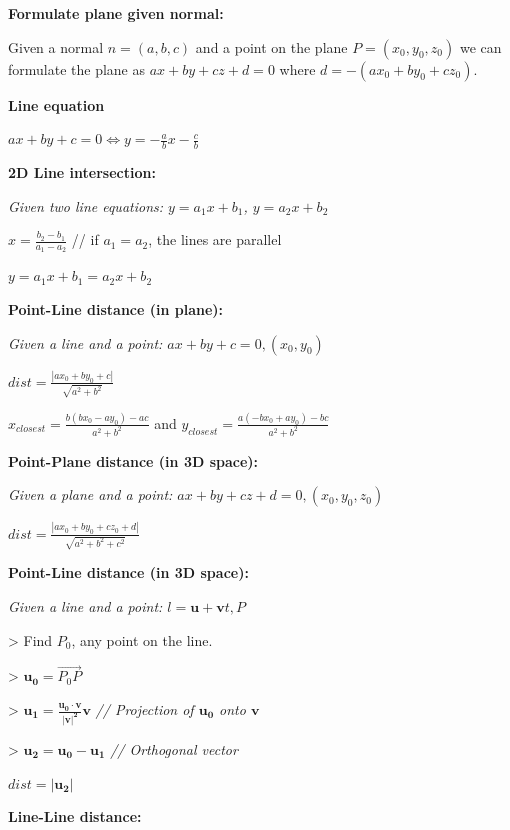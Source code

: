 \documentclass[8pt,a4paper,landscape,oneside]{amsart}
\begin{document}
\begin{multicols*}{3}
  \textbf{Formulate plane given normal:}
  
  Given a normal $n=(a,b,c)$ and a point on the plane $P=(x_0,y_0,z_0)$ we can formulate the plane as $ax +by +cz + d = 0$ where $d = -(ax_0 + by_0 + cz_0)$.
  \newline
  
  \textbf{Line equation}

  $ax + by + c = 0 \Leftrightarrow y = -\frac{a}{b}x -\frac{c}{b}$
  \newline

  \textbf{2D Line intersection:} 

  \textit{Given two line equations: $y = a_1x + b_1$, $y = a_2x + b_2$}

  $x = \frac{b_2 - b_1}{a_1 - a_2}$ // if $a_1 = a_2$, the lines are parallel

  $y = a_1x + b_1 = a_2x + b_2$
  \newline

  \textbf{Point-Line distance (in plane):} 

  \textit{Given a line and a point: $ax+by+c=0, (x_0, y_0)$}

  $dist = \frac{|ax_0+by_0+c|}{\sqrt{a^2+b^2}}$

  $x_{closest}=\frac{b(bx_0-ay_0)-ac}{a^2+b^2}$ and $y_{closest}={\frac{a(-bx_0+ay_0)-bc}{a^2+b^2}}$
  \newline

  \textbf{Point-Plane distance (in 3D space):} 

  \textit{Given a plane and a point: $ax+by+cz+d=0, (x_0, y_0, z_0)$}

  $dist = \frac{|ax_0+by_0+cz_0+d|}{\sqrt{a^2+b^2+c^2}}$
\newline

  \textbf{Point-Line distance (in 3D space):} 

  \textit{Given a line and a point: $l = \mathbf{u} + \mathbf{v}t, P$}

  > Find $P_0$, any point on the line.

  > $\mathbf{u_0} = \overrightarrow{P_0P}$

  > $\mathbf{u_1} = \mathbf{\frac{u_0 \cdot v}{|v|^2} v}$ \textit{// Projection of $\mathbf{u_0}$ onto $\mathbf{v}$}

  > $\mathbf{u_2} = \mathbf{u_0 - u_1}$ \textit{// Orthogonal vector}

  $dist = |\mathbf{u_2}|$
  \newline

  \textbf{Line-Line distance:} 


\end{multicols*}
\end{document}
